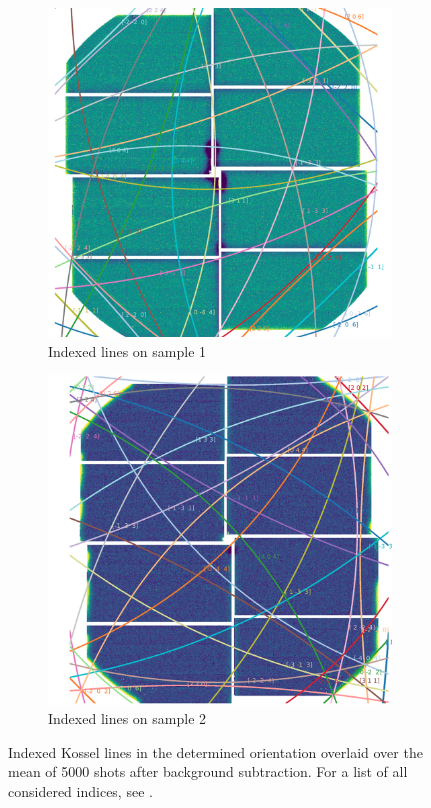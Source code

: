 \begin{figure}
	\centering
	\begin{subfigure}{0.35\textwidth}
		\includegraphics[width=\linewidth]{images/kosselgaas1.png}
		\caption{Indexed lines on sample 1}
	\end{subfigure}
	\hspace{0.2cm}
	\begin{subfigure}{0.35\textwidth}
		\includegraphics[width=\linewidth]{images/kosselgaas2.png}
		\caption{Indexed lines on sample 2}
	\end{subfigure}
	\caption[Kossel lines on GaAs samples]{Indexed Kossel lines in the determined orientation overlaid over the mean of 5000 shots after background subtraction. For a list of all considered indices, see  .}
	\label{fig:kosselgaaslines}
\end{figure}

